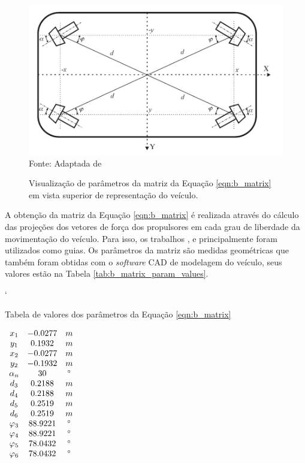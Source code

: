 \begin{figure}[H]
	\centering
	\caption{Visualização de parâmetros da matriz da Equação \ref{eqn:b_matrix} em vista superior de representação do veículo. }
	\label{fig:side_thrusters}
	\includegraphics[width=0.8\linewidth]{images/side_thrusters.png}\\
	\footnotesize Fonte: Adaptada de \cite{thruster_allocation}
\end{figure}

A obtenção da matriz da Equação \ref{eqn:b_matrix} é realizada através do cálculo das projeções dos vetores de força dos propulsores em cada grau de liberdade da movimentação do veículo. Para isso, os trabalhos \cite{Antonelli2018} \cite{fossen1994guidance} \cite{fossen2011handbook} \cite{rov_modeling_1}, \cite{rov_modeling_2} e principalmente \cite{thruster_allocation} foram utilizados como guias. Os parâmetros da matriz são medidas geométricas que também foram obtidas com o \textit{software} CAD de modelagem do veículo, seus valores estão na Tabela \ref{tab:b_matrix_param_values}. 

\begin{table}[H]
	\centering`
	\label{tab:b_matrix_param_values}
	\caption{Tabela de valores dos parâmetros da Equação \ref{eqn:b_matrix}}
	$\begin{array}{c c c}
		\begin{matrix} 
			x_1 & -0.0277 & m\\ 
			y_1 &  0.1932 & m\\ 
			x_2 & -0.0277 & m\\ 
			y_2 & -0.1932 & m\\ 
			\alpha_n & 30 & ^{\circ}\\		
			d_3 & 0.2188 & m\\ 		
			d_4 & 0.2188 & m\\ 		
			d_5 & 0.2519 & m\\ 		
			d_6 & 0.2519 & m\\ 
			\varphi_3 & 88.9221 & ^{\circ} \\
			\varphi_4 & 88.9221 & ^{\circ} \\
			\varphi_5 & 78.0432 & ^{\circ} \\
			\varphi_6 & 78.0432 & ^{\circ} 
		\end{matrix}
	\end{array}$
\end{table}

